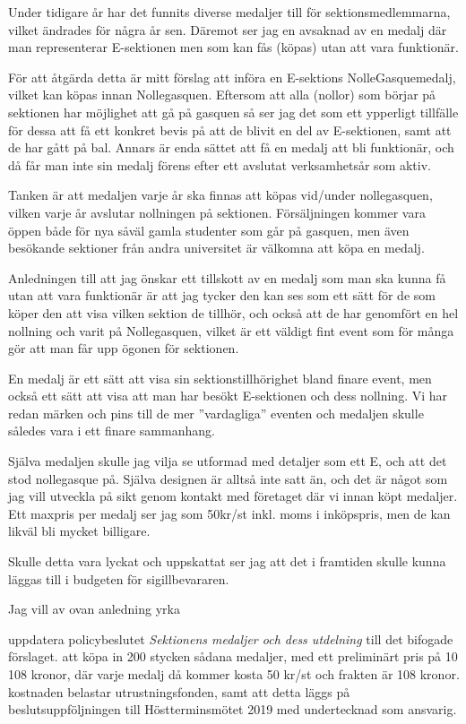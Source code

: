 \documentclass[../_main/handlingar.tex]{subfiles}
\begin{document}

Under tidigare år har det funnits diverse medaljer till för sektionsmedlemmarna,
vilket ändrades för några år sen. Däremot ser jag en avsaknad av en medalj där man
representerar E-sektionen men som kan fås (köpas) utan att vara funktionär.

För att åtgärda detta är mitt förslag att införa en E-sektions NolleGasquemedalj,
vilket kan köpas innan Nollegasquen. Eftersom att alla (nollor) som börjar på
sektionen har möjlighet att gå på gasquen så ser jag det som ett ypperligt tillfälle för
dessa att få ett konkret bevis på att de blivit en del av E-sektionen, samt att de har
gått på bal. Annars är enda sättet att få en medalj att bli funktionär, och då får man
inte sin medalj förens efter ett avslutat verksamhetsår som aktiv.

Tanken är att medaljen varje år ska finnas att köpas vid/under nollegasquen, vilken
varje år avslutar nollningen på sektionen. Försäljningen kommer vara öppen både för
nya såväl gamla studenter som går på gasquen, men även besökande sektioner från
andra universitet är välkomna att köpa en medalj.

Anledningen till att jag önskar ett tillskott av en medalj som man ska kunna få utan
att vara funktionär är att jag tycker den kan ses som ett sätt för de som köper den att
visa vilken sektion de tillhör, och också att de har genomfört en hel nollning och varit
på Nollegasquen, vilket är ett väldigt fint event som för många gör att man får upp
ögonen för sektionen.

En medalj är ett sätt att visa sin sektionstillhörighet bland finare event, men också ett
sätt att visa att man har besökt E-sektionen och dess nollning. Vi har redan märken
och pins till de mer ”vardagliga” eventen och medaljen skulle således vara i ett finare
sammanhang.

Själva medaljen skulle jag vilja se utformad med detaljer som ett E, och att det stod
nollegasque på. Själva designen är alltså inte satt än, och det är något som jag vill
utveckla på sikt genom kontakt med företaget där vi innan köpt medaljer. Ett maxpris
per medalj ser jag som 50kr/st inkl. moms i inköpspris, men de kan likväl bli mycket
billigare.

Skulle detta vara lyckat och uppskattat ser jag att det i framtiden skulle kunna läggas
till i budgeten för sigillbevararen.

Jag vill av ovan anledning yrka 
\begin{attsatser}
    \att uppdatera policybeslutet \emph{Sektionens medaljer och dess utdelning} till det bifogade förslaget.
    \att att köpa in 200 stycken sådana medaljer, med ett preliminärt pris på 10 108 kronor, där varje medalj då kommer kosta 50 kr/st och frakten är 108 kronor.
    \att kostnaden belastar utrustningsfonden, samt    
    \att att detta läggs på beslutsuppföljningen till Höstterminsmötet 2019 med undertecknad som ansvarig.
\end{attsatser}
\end{document}
